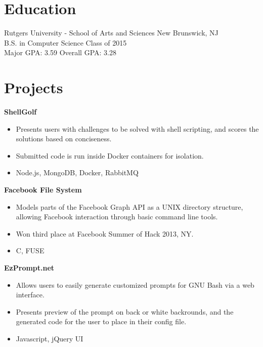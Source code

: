 \documentclass[centered,overlapped]{res}
\begin{document}
\begin{resume}
\section{Education}

Rutgers University - School of Arts and Sciences \hfill New Brunswick, NJ\\
B.S. in Computer Science \hfill Class of 2015\\
Major GPA: 3.59 \hfill Overall GPA: 3.28




\section{Projects}

	{\bf ShellGolf}
  \begin{itemize} \itemsep -2pt %
    \item Presents users with challenges to be solved with shell scripting, and
      scores the solutions based on conciseness.
    \item Submitted code is run inside Docker containers for isolation.
    \item Node.js, MongoDB, Docker, RabbitMQ
  \end{itemize}

	{\bf Facebook File System}
  \begin{itemize} \itemsep -2pt %
    \item Models parts of the Facebook Graph API as a UNIX directory structure,
      allowing Facebook interaction through basic command line tools.
    \item Won third place at Facebook Summer of Hack 2013, NY.
    \item C, FUSE
  \end{itemize}

  {\bf EzPrompt.net}
  \begin{itemize} \itemsep -2pt %
    \item Allows users to easily generate customized prompts for GNU Bash via a
      web interface.
    \item Presents preview of the prompt on back or white backrounds, and the
      generated code for the user to place in their config file.
    \item Javascript, jQuery UI
  \end{itemize}


\end{resume}
\end{document}
